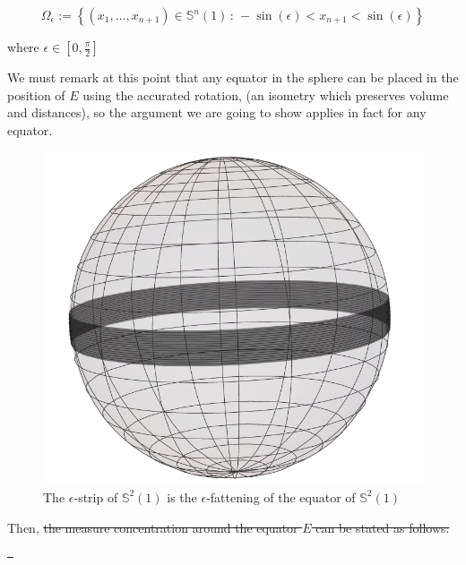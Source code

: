 \documentclass{amsart}
\newtheorem{corollary}[theorem]{Corollary}
\theoremstyle{definition}
\theoremstyle{remark}
\providecommand{\DIFdel}[1]{{\protect\color{red}\sout{#1}}}                      %
\providecommand{\DIFdelbegin}{} %
\begin{document}
\begin{equation*}
\Omega_\epsilon:=\left\lbrace  (x_1,\ldots,x_{n+1})\in \mathbb{S}^{n}(1)\, :\, -\sin(\epsilon)<x_{n+1}<\sin(\epsilon)\right\rbrace
\end{equation*}

\noindent where $\epsilon \in [0,\frac{\pi}{2}]$

We must remark at this point that any equator in the sphere can be placed in the position of $E$ using the accurated rotation, (an isometry which preserves volume and distances), so the argument we are going to show applies in fact for any equator.


\begin{center}
\begin{figure}\label{fig:e-strip}
    \centering
    \includegraphics[scale=0.35]{banda}
    \caption{The $\epsilon$-strip of $\mathbb{S}^2(1)$ is the $\epsilon$-fattening of the equator of $\mathbb{S}^2(1)$}
\end{figure}
\end{center}

Then, \DIFdelbegin \DIFdel{the measure concentration around the equator $E$ can be stated as  follows: 
}%

\DIFdel{\
}%
\end{document}

